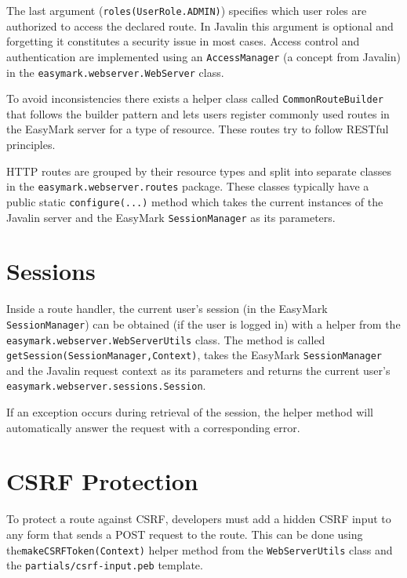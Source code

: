 \documentclass[12pt,a4paper]{report}
\begin{document}
	The last argument (\lstinline|roles(UserRole.ADMIN)|) specifies which user roles are authorized to access the declared route. In Javalin this argument is optional and forgetting it constitutes a security issue in most cases. Access control and authentication are implemented using an \lstinline|AccessManager| (a concept from Javalin) in the \lstinline|easymark.webserver.|\linebreak\lstinline|WebServer| class.

	To avoid inconsistencies there exists a helper class called \lstinline|CommonRouteBuilder| that follows the builder pattern and lets users register commonly used routes in the EasyMark server for a type of resource. These routes try to follow RESTful principles.

	HTTP routes are grouped by their resource types and split into separate classes in the \lstinline|easymark.webserver.routes| package. These classes typically have a public static \lstinline|configure(...)| method which takes the current instances of the Javalin server and the EasyMark \lstinline|SessionManager| as its parameters.

	\section{Sessions}
	Inside a route handler, the current user's session (in the EasyMark \lstinline|SessionManager|) can be obtained (if the user is logged in) with a helper from the \lstinline|easymark.webserver.|\linebreak\lstinline|WebServerUtils| class. The method is called \lstinline|getSession(SessionManager,|\linebreak\lstinline|Context)|, takes the EasyMark \lstinline|SessionManager| and the Javalin request context as its parameters and returns the current user's \lstinline|easymark.webserver.sessions.Session|.

	If an exception occurs during retrieval of the session, the helper method will automatically answer the request with a corresponding error.

	\section{CSRF Protection}
	To protect a route against CSRF, developers must add a hidden CSRF input to any form that sends a POST request to the route. This can be done using the\linebreak\lstinline|makeCSRFToken(Context)| helper method from the \lstinline|WebServerUtils| class and the \lstinline|partials/csrf-input.peb| template.
\end{document}
